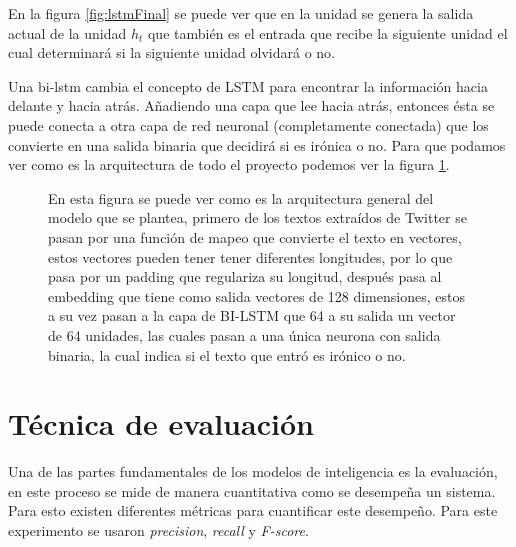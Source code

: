           
\par En la figura \ref{fig:lstmFinal} se puede ver que en la unidad se genera la salida actual de la unidad $h_t$ que también es el entrada que recibe la siguiente unidad el cual determinará si la siguiente unidad olvidará o no. 
           
\par Una \gls{bi-lstm} cambia el concepto de LSTM para encontrar la información hacia delante y hacia atrás. Añadiendo una capa que lee hacia atrás, entonces ésta se puede conecta a otra capa de red neuronal (completamente conectada) que los convierte en una salida binaria que decidirá si es irónica o no. Para que podamos ver como es la arquitectura de todo el proyecto podemos ver la figura \ref{fig:arquitectura}. 
           
\begin{landscape}
	           
	\begin{figure}
		\centering
		
		\caption{En esta figura se puede ver como es la arquitectura general del modelo que se plantea, primero de los textos extraídos de Twitter se pasan por una función de mapeo que convierte el texto en vectores, estos vectores pueden tener tener diferentes longitudes, por lo que pasa por un \gls{padding} que regulariza su longitud, después pasa al embedding que tiene como salida vectores de 128 dimensiones, estos a su vez pasan a la capa de BI-LSTM que 64 a su salida un vector de 64 unidades, las cuales pasan a una única neurona con salida binaria, la cual indica si el texto que entró es irónico o no.}
		\label{fig:arquitectura}
	\end{figure}
\end{landscape}
		
\section{Técnica de evaluación}
	
\par Una de las partes fundamentales de los modelos de inteligencia es la evaluación, en este proceso se mide de manera cuantitativa como se desempeña un sistema. Para esto existen diferentes métricas para cuantificar este desempeño. Para este experimento se usaron \textit{precision}, \textit{recall} y \textit{F-score}. 
	
